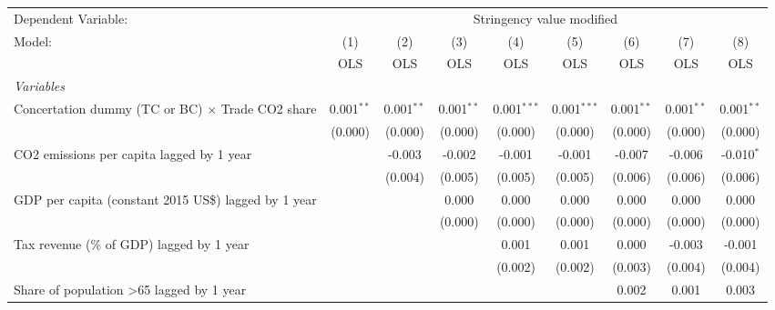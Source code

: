 
\begingroup
\centering
\begin{tabular}{lcccccccc}
   \toprule
   Dependent Variable: & \multicolumn{8}{c}{Stringency value modified}\\
   Model:                                                    & (1)          & (2)          & (3)          & (4)           & (5)           & (6)          & (7)          & (8)\\  
                                                             &  OLS         & OLS          & OLS          & OLS           & OLS           & OLS          & OLS          & OLS\\  
   \midrule
   \emph{Variables}\\
   Concertation dummy (TC or BC) $\times$ Trade CO2 share    & 0.001$^{**}$ & 0.001$^{**}$ & 0.001$^{**}$ & 0.001$^{***}$ & 0.001$^{***}$ & 0.001$^{**}$ & 0.001$^{**}$ & 0.001$^{**}$\\   
                                                             & (0.000)      & (0.000)      & (0.000)      & (0.000)       & (0.000)       & (0.000)      & (0.000)      & (0.000)\\   
   CO2 emissions per capita lagged by 1 year                 &              & -0.003       & -0.002       & -0.001        & -0.001        & -0.007       & -0.006       & -0.010$^{*}$\\   
                                                             &              & (0.004)      & (0.005)      & (0.005)       & (0.005)       & (0.006)      & (0.006)      & (0.006)\\   
   GDP per capita (constant 2015 US\$) lagged by 1 year      &              &              & 0.000        & 0.000         & 0.000         & 0.000        & 0.000        & 0.000\\   
                                                             &              &              & (0.000)      & (0.000)       & (0.000)       & (0.000)      & (0.000)      & (0.000)\\   
   Tax revenue (\% of GDP) lagged by 1 year                  &              &              &              & 0.001         & 0.001         & 0.000        & -0.003       & -0.001\\   
                                                             &              &              &              & (0.002)       & (0.002)       & (0.003)      & (0.004)      & (0.004)\\   
   Share of population >65 lagged by 1 year                  &              &              &              &               &               & 0.002        & 0.001        & 0.003\\   

\end{tabular}

